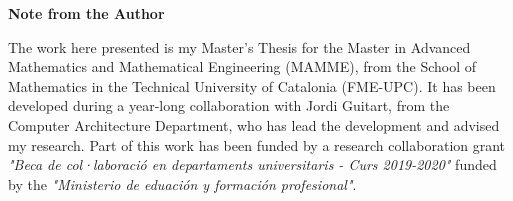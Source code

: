 \vspace*{4cm}
\Huge
\textbf{Note from the Author} \label{sec:acknowledgments}
\normalsize

\vspace{1cm}

The work here presented is my Master's Thesis for the Master in Advanced Mathematics and Mathematical Engineering (MAMME), from the School of Mathematics in the Technical University of Catalonia (FME-UPC).
It has been developed during a year-long collaboration with Jordi Guitart, from the Computer Architecture Department, who has lead the development and advised my research.
Part of this work has been funded by a research collaboration grant \textit{"Beca de col·laboraci\'o en departaments universitaris - Curs 2019-2020"} funded by the \textit{"Ministerio de eduaci\'on y formaci\'on profesional"}.

%
%

\vspace*{\fill}
